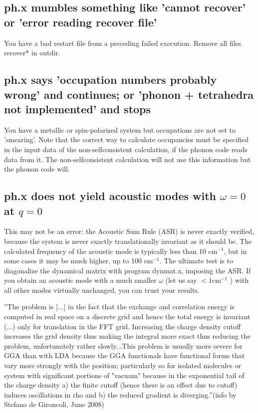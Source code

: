 \documentclass[12pt,a4paper]{article}
\begin{document}
\subsection{ph.x mumbles something like 'cannot recover' or 'error
  reading recover file'} 
You have a bad restart file from a preceding failed execution.
Remove all files recover* in outdir.

\subsection{ph.x says 'occupation numbers probably wrong' and
  continues; or 'phonon + tetrahedra not implemented' and stops} 
You have a
metallic or spin-polarized system but occupations are not set to 'smearing'.
Note that the correct way to calculate occupancies must be specified in the
input data of the non-selfconsistent calculation, if the phonon code reads
data from it. The non-selfconsistent calculation will not use this information
but the phonon code will.

\subsection{ph.x does not yield acoustic modes with $\omega=0$ at $q=0$}
This may not be an error: the Acoustic Sum Rule (ASR) is never exactly
verified, because the system is never exactly translationally
invariant as it should be.  The calculated frequency of the acoustic
mode is typically less than 10 cm$^{-1}$, but in some cases it may be
much higher, up to 100 cm$^{-1}$. The ultimate test is to diagonalize
the dynamical matrix with program dynmat.x, imposing the ASR. If you
obtain an acoustic mode with a much smaller $\omega$ (let us say 
$< 1 \mbox{cm}^{-1}$ ) 
with all other modes virtually unchanged, you can trust your results.

''The problem is [...] in the fact that the exchange and correlation
energy is computed in real space on a discrete grid and hence the
total energy is invariant (...) only for translation in the FFT
grid. Increasing the charge density cutoff increases the grid density
thus making the integral more exact thus reducing the problem,
unfortunately rather slowly...This problem is usually more severe for
GGA  than with LDA because the GGA functionals have functional forms
that vary more strongly with the position; particularly so for
isolated molecules or system with significant portions of "vacuum"
because in the exponential tail of the charge density a) the finite
cutoff  (hence there is an effect due to cutoff) induces oscillations
in rho and b) the reduced gradient is diverging.''(info by Stefano de
Gironcoli, June 2008) 
\end{document}
